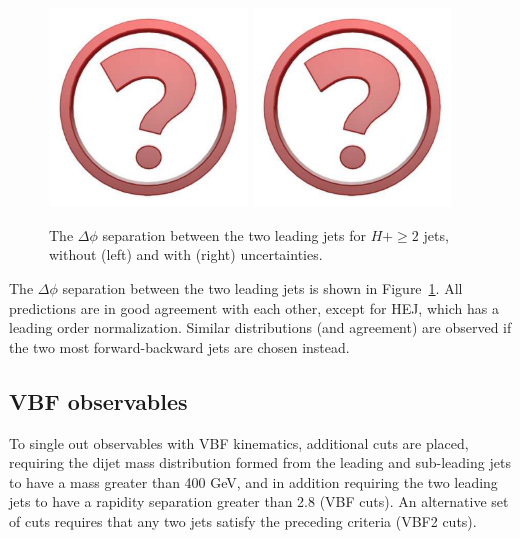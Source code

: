 \begin{figure}[t!]
  \centering
  \includegraphics[width=0.47\textwidth]{Micon.pdf}
  \hfill
  \includegraphics[width=0.47\textwidth]{Micon.pdf}
  \caption{
    The $\Delta\phi$ separation between the two leading jets for
    $H+\ge2$ jets, without (left) and with (right) uncertainties. 
    \label{fig:higgscomp:results:2obs:dphi_jj}
  }
\end{figure}

The $\Delta\phi$ separation between the two leading jets is shown in
Figure~\ref{fig:higgscomp:results:2obs:dphi_jj}. All predictions are
in good agreement with each other, except for HEJ, which has a leading
order normalization. Similar distributions (and agreement) are
observed if the two most forward-backward jets are chosen instead.



\clearpage
\subsection{VBF observables}
\label{sec:hjetscomp:results:VBFobs}

To single out observables with VBF kinematics, additional cuts are
placed, requiring the dijet mass distribution formed from the leading
and sub-leading jets to have a mass greater than 400 GeV, and in
addition requiring the two leading jets to have a rapidity separation
greater than 2.8 (VBF cuts). An alternative set of cuts requires that
any two jets satisfy the preceding criteria (VBF2 cuts).

